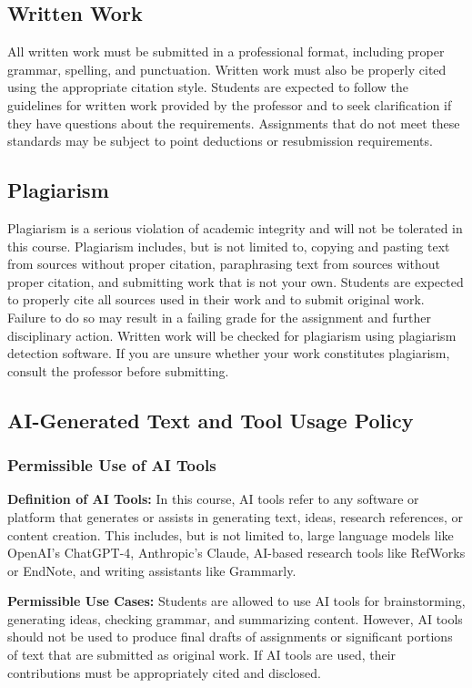 \documentclass[11pt, letterpaper]{article}
\begin{document}
\subsection*{Written Work}
All written work must be submitted in a professional format, including proper grammar, spelling, and punctuation. Written work must also be properly cited using the appropriate citation style. Students are expected to follow the guidelines for written work provided by the professor and to seek clarification if they have questions about the requirements. Assignments that do not meet these standards may be subject to point deductions or resubmission requirements.

\subsection*{Plagiarism}
Plagiarism is a serious violation of academic integrity and will not be tolerated in this course. Plagiarism includes, but is not limited to, copying and pasting text from sources without proper citation, paraphrasing text from sources without proper citation, and submitting work that is not your own. Students are expected to properly cite all sources used in their work and to submit original work. Failure to do so may result in a failing grade for the assignment and further disciplinary action. Written work will be checked for plagiarism using plagiarism detection software. If you are unsure whether your work constitutes plagiarism, consult the professor before submitting.

\subsection*{AI-Generated Text and Tool Usage Policy}

\subsubsection*{Permissible Use of AI Tools}
\textbf{Definition of AI Tools:} In this course, AI tools refer to any software or platform that generates or assists in generating text, ideas, research references, or content creation. This includes, but is not limited to, large language models like OpenAI’s ChatGPT-4, Anthropic’s Claude, AI-based research tools like RefWorks or EndNote, and writing assistants like Grammarly.

\vspace{1ex}

\noindent\textbf{Permissible Use Cases:} Students are allowed to use AI tools for brainstorming, generating ideas, checking grammar, and summarizing content. However, AI tools should not be used to produce final drafts of assignments or significant portions of text that are submitted as original work. If AI tools are used, their contributions must be appropriately cited and disclosed.
\end{document}
